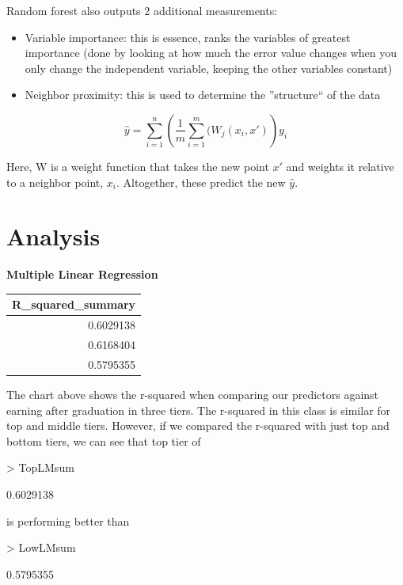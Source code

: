 \documentclass{article}
\begin{document}
Random forest also outputs 2 additional measurements:
\begin{itemize}
\item Variable importance: this is essence, ranks the variables of greatest importance (done by looking at how much the error value changes when you only change the independent variable, keeping the other variables constant)
\item Neighbor proximity: this is used to determine the ''structure`` of the data
\end{itemize}

$$\hat y =  \sum_{i=1}^{n} \left(\frac{1}{m} \sum_{i=1}^{m} (W_j(x_i,x')\right)y_i$$

Here, W is a weight function that takes the new point $x'$ and weights it relative to a neighbor point, $x_i$.  Altogether, these predict the new $\hat y$.



\section{Analysis}

\textbf{Multiple Linear Regression}\newline
\begin{table}[ht]
\centering
\begin{tabular}{r}
  \hline
R\_squared\_summary \\ 
  \hline
0.6029138 \\ 
  0.6168404 \\ 
  0.5795355 \\ 
   \hline
\end{tabular}
\end{table}The chart above shows the r-squared when comparing our predictors against earning after graduation in three tiers. The r-squared in this class is similar for top and middle tiers. However, if we compared the r-squared with just top and bottom tiers, we can see that top tier of 
\begin{Schunk}
\begin{Sinput}
> TopLMsum
\end{Sinput}
\begin{Soutput}
[1] 0.6029138
\end{Soutput}
\end{Schunk}
is performing better than 
\begin{Schunk}
\begin{Sinput}
> LowLMsum
\end{Sinput}
\begin{Soutput}
[1] 0.5795355
\end{Soutput}
\end{Schunk}
\end{document}
